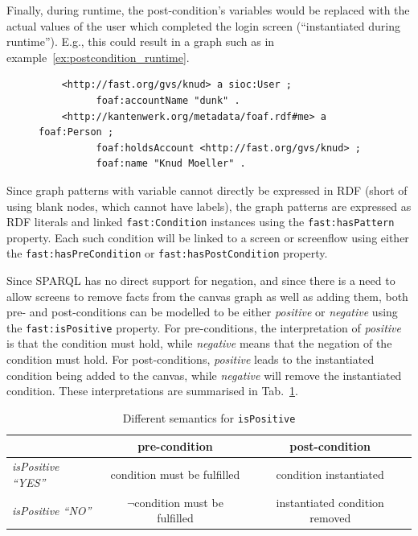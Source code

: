 \documentclass{fast_latex}
\begin{document}
Finally, during runtime, the post-condition's variables would be replaced with the actual values of the user which completed the login screen (``instantiated during runtime''). E.g., this could result in a graph such as in example~\ref{ex:postcondition_runtime}.

\singlespacing
{}
\begin{figure}[ht]
\begin{lstlisting}
	<http://fast.org/gvs/knud> a sioc:User ;
	      foaf:accountName "dunk" .
	<http://kantenwerk.org/metadata/foaf.rdf#me> a foaf:Person ;
	      foaf:holdsAccount <http://fast.org/gvs/knud> ;
	      foaf:name "Knud Moeller" .
\end{lstlisting}
\end{figure}
\doublespacing


Since graph patterns with variable cannot directly be expressed in RDF (short of using blank nodes, which cannot have labels), the graph patterns are expressed as RDF literals and linked \texttt{fast:Condition} instances using the \texttt{fast:hasPattern} property.
Each such condition will be linked to a screen or screenflow using either the \texttt{fast:hasPreCondition} or \texttt{fast:hasPostCondition} property.

Since SPARQL has no direct support for negation, and since there is a need to allow screens to remove facts from the canvas graph as well as adding them, both pre- and post-conditions can be modelled to be either \emph{positive} or \emph{negative} using the \texttt{fast:isPositive} property. For pre-conditions, the interpretation of \emph{positive} is that the condition must hold, while \emph{negative} means that the negation of the condition must hold. For post-conditions, \emph{positive} leads to the instantiated condition being added to the canvas, while \emph{negative} will remove the instantiated condition. These interpretations are summarised in Tab.~\ref{tab:is_positive}.

\begin{table}[h]
\caption{Different semantics for \texttt{isPositive}}
\label{tab:is_positive}
\begin{center}
\begin{tabular}{|l|c|c|}
\hline
& pre-condition & post-condition \\ \hline
\emph{isPositive ``YES''} & condition must be fulfilled & condition instantiated\\ \hline
\emph{isPositive ``NO''} & $\neg$condition must be fulfilled & instantiated condition removed \\ \hline
\end{tabular}
\end{center}
\end{table}
\end{document}
